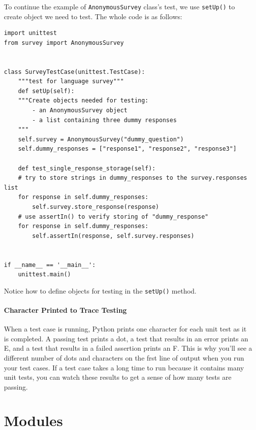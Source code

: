 \documentclass[12pt]{book}
\begin{document}
To continue the example of \texttt{AnonymousSurvey} class's test, we use \texttt{setUp()} to create object we need to test. The whole code is as follows:
\begin{verbatim}
import unittest
from survey import AnonymousSurvey


class SurveyTestCase(unittest.TestCase):
    """test for language survey"""
    def setUp(self):
	"""Create objects needed for testing:
	    - an AnonymousSurvey object
	    - a list containing three dummy responses
	"""
	self.survey = AnonymousSurvey("dummy_question")
	self.dummy_responses = ["response1", "response2", "response3"]

    def test_single_response_storage(self):
	# try to store strings in dummy_responses to the survey.responses list
	for response in self.dummy_responses:
	    self.survey.store_response(response)
	# use assertIn() to verify storing of "dummy_response"
	for response in self.dummy_responses:
	    self.assertIn(response, self.survey.responses)


if __name__ == '__main__':
    unittest.main()

\end{verbatim}
Notice how to define objects for testing in the \texttt{setUp()} method.

\subsection{Character Printed to Trace Testing}
\label{sec:orgfd1eae6}
When a test case is running, Python prints one character for each unit test as it is completed. A passing test prints a dot, a test that results in an error prints an E, and a test that results in a failed assertion prints an F. This is why you’ll see a different number of dots and characters on the frst line of output when you run your test cases. If a test case takes a long time to run because it contains many unit tests, you can watch these results to get a sense of how many tests are passing.

\part{Modules}
\label{sec:orgd101b3f}
\end{document}
